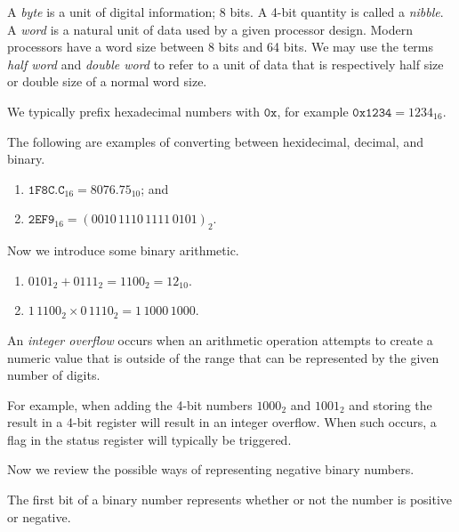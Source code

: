 \begin{definition}
	A \emph{byte} is a unit of digital information; 8 bits.
	A 4-bit quantity is called a \emph{nibble}.
	A \emph{word} is a natural unit of data used by a given processor design.
	Modern processors have a word size between 8 bits and 64 bits.
	We may use the terms \emph{half word} and \emph{double word}
	to refer to a unit of data that is respectively half size or double size
	of a normal word size.
\end{definition}

We typically prefix hexadecimal numbers with $\mathtt{0x}$, for example
$\mathtt{0x1234} = 1234_{16}$.

The following are examples of converting between hexidecimal, decimal, and
binary.

\begin{examples}
	\begin{enumerate}
		\item $\mathtt{1F8C.C}_{16} = 8076.75_{10}$; and
		\item $\mathtt{2EF9}_{16} = (0010\,1110\,1111\,0101)_2$.
	\end{enumerate}
\end{examples}

Now we introduce some binary arithmetic.

\begin{examples}
	\begin{enumerate}
		\item $0101_2 + 0111_2 = 1100_2 = 12_{10}$.
		\item $1\,1100_2 \times 0\,1110_2 = 1\,1000\,1000$.
	\end{enumerate}
\end{examples}

\begin{definition}
	An \emph{integer overflow} occurs when an arithmetic operation attempts to create a numeric value that is outside of the range that can be represented
	by the given number of digits.
\end{definition}

For example, when adding the 4-bit numbers $1000_2$ and $1001_2$ and storing
the result in a 4-bit register will result in an integer overflow.
When such occurs, a flag in the status register will typically be triggered.

Now we review the possible ways of representing negative binary numbers.

\begin{definition}
	The first bit of a binary number represents whether or not the number
	is positive or negative.
\end{definition}

